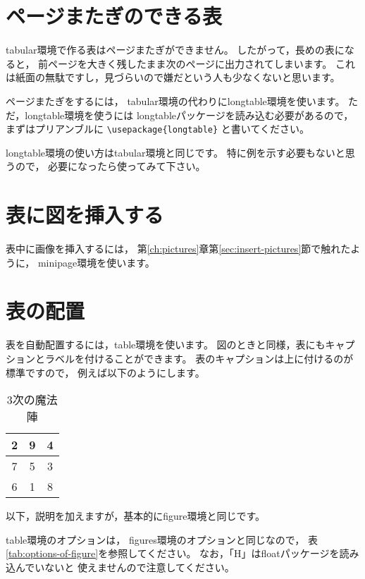 \section{ページまたぎのできる表}
tabular環境で作る表はページまたぎができません。
したがって，長めの表になると，
前ページを大きく残したまま次のページに出力されてしまいます。
これは紙面の無駄ですし，見づらいので嫌だという人も少なくないと思います。

ページまたぎをするには，
tabular環境の代わりにlongtable環境を使います。
ただ，longtable環境を使うには
longtableパッケージを読み込む必要があるので，
まずはプリアンブルに \verb|\usepackage{longtable}| と書いてください。

longtable環境の使い方はtabular環境と同じです。
特に例を示す必要もないと思うので，
必要になったら使ってみて下さい。



\section{表に図を挿入する}
表中に画像を挿入するには，
第\ref{ch:pictures}章第\ref{sec:insert-pictures}節で触れたように，
minipage環境を使います。



\section{表の配置}
表を自動配置するには，table環境を使います。
図のときと同様，表にもキャプションとラベルを付けることができます。
表のキャプションは上に付けるのが標準ですので，
例えば以下のようにします。

\begin{ITeX}
\begin{table}
\caption{3次の魔法陣}
\label{tab:magic-table}
\begin{center}
\begin{tabular}{|c|c|c|} \hline
2 & 9 & 4 \\ \hline
7 & 5 & 3 \\ \hline
6 & 1 & 8 \\ \hline
\end{tabular}
\end{center}
\end{table}
\end{ITeX}

以下，説明を加えますが，基本的にfigure環境と同じです。

table環境のオプションは，
figures環境のオプションと同じなので，
表\ref{tab:options-of-figure}を参照してください。
なお，「H」はfloatパッケージを読み込んでいないと
使えませんので注意してください。

